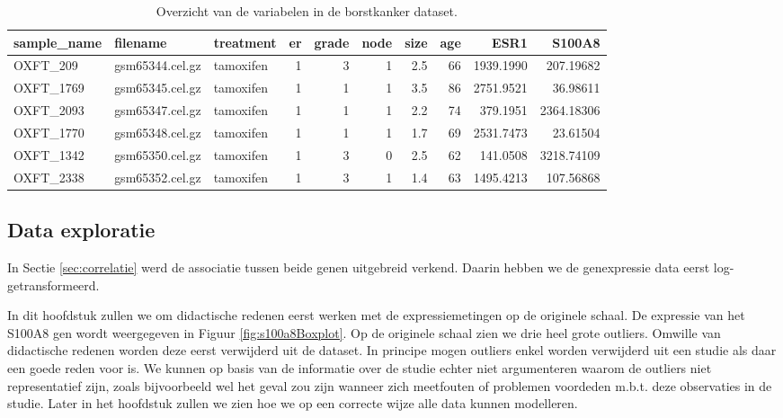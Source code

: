 \documentclass[
  12pt,dutch,coursenotes]{book}
\theoremstyle{definition}
\theoremstyle{definition}
\theoremstyle{definition}
\theoremstyle{definition}
\theoremstyle{remark}
\begin{document}
\begin{table}

\caption{\label{tab:brcaMicroLin}Overzicht van de variabelen in de borstkanker dataset.}
\centering
\begin{tabular}[t]{lllrrrrrrr}
\toprule
sample\_name & filename & treatment & er & grade & node & size & age & ESR1 & S100A8\\
\midrule
OXFT\_209 & gsm65344.cel.gz & tamoxifen & 1 & 3 & 1 & 2.5 & 66 & 1939.1990 & 207.19682\\
OXFT\_1769 & gsm65345.cel.gz & tamoxifen & 1 & 1 & 1 & 3.5 & 86 & 2751.9521 & 36.98611\\
OXFT\_2093 & gsm65347.cel.gz & tamoxifen & 1 & 1 & 1 & 2.2 & 74 & 379.1951 & 2364.18306\\
OXFT\_1770 & gsm65348.cel.gz & tamoxifen & 1 & 1 & 1 & 1.7 & 69 & 2531.7473 & 23.61504\\
OXFT\_1342 & gsm65350.cel.gz & tamoxifen & 1 & 3 & 0 & 2.5 & 62 & 141.0508 & 3218.74109\\
\addlinespace
OXFT\_2338 & gsm65352.cel.gz & tamoxifen & 1 & 3 & 1 & 1.4 & 63 & 1495.4213 & 107.56868\\
\bottomrule
\end{tabular}
\end{table}

\hypertarget{data-exploratie}{%
\subsection{Data exploratie}\label{data-exploratie}}

In Sectie \ref{sec:correlatie} werd de associatie tussen beide genen uitgebreid verkend. Daarin hebben we de genexpressie data eerst log-getransformeerd.

In dit hoofdstuk zullen we om didactische redenen eerst werken met de expressiemetingen op de originele schaal.
De expressie van het S100A8 gen wordt weergegeven in Figuur \ref{fig:s100a8Boxplot}. Op de originele schaal zien we drie heel grote outliers. Omwille van didactische redenen worden deze eerst verwijderd uit de dataset. In principe mogen outliers enkel worden verwijderd uit een studie als daar een goede reden voor is. We kunnen op basis van de informatie over de studie echter niet argumenteren waarom de outliers niet representatief zijn, zoals bijvoorbeeld wel het geval zou zijn wanneer zich meetfouten of problemen voordeden m.b.t. deze observaties in de studie. Later in het hoofdstuk zullen we zien hoe we op een correcte wijze alle data kunnen modelleren.
\end{document}
